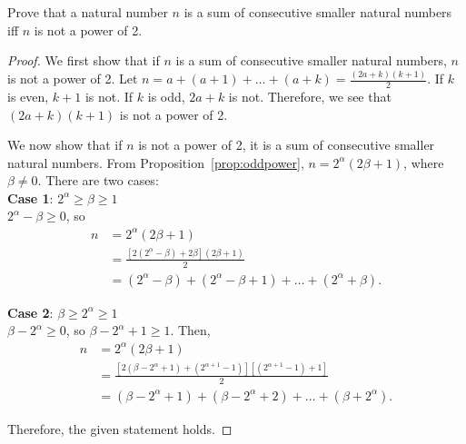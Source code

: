 \documentclass[../main.tex]{subfiles}
\begin{document}
\begin{prob} 
    Prove that a natural number $n$ is a sum of consecutive smaller natural numbers iff $n$ is not a power of 2.
\end{prob}
\begin{proof}
    We first show that if $n$ is a sum of consecutive smaller natural numbers, $n$ is not a power of 2.
    Let $n = a + (a+1) + \dots + (a+k) = \frac{(2a + k)(k+1)}{2}$.
    If $k$ is even, $k+1$ is not.
    If $k$ is odd, $2a + k$ is not.
    Therefore, we see that $(2a + k)(k + 1)$ is not a power of 2.

    We now show that if $n$ is not a power of 2, it is a sum of consecutive smaller natural numbers.
    From Proposition~\ref{prop:oddpower}, $n = 2^\alpha (2 \beta + 1)$, where $\beta \neq 0$.
    There are two cases:\\
    \noindent \textbf{Case 1}: $2^\alpha \geq \beta \geq 1$\\
    \indent $2^\alpha - \beta \geq 0$, so
    \begin{align*}
        n &= 2^\alpha (2\beta + 1)\\
          &= \frac{\left[2 \left(2^\alpha - \beta\right) + 2 \beta\right](2\beta + 1)}{2}\\
          &= \left(2^\alpha - \beta\right) + \left(2^\alpha - \beta + 1\right) + \dots + \left(2^\alpha + \beta\right).
    \end{align*}

    \noindent \textbf{Case 2}: $\beta \geq 2^\alpha \geq 1$\\
    \indent $\beta - 2^\alpha \geq 0$, so $\beta - 2^\alpha + 1 \geq 1$.
    Then,
    \begin{align*}
        n &= 2^\alpha (2\beta + 1)\\
          &= \frac{\left[2\left(\beta - 2^\alpha + 1\right) + \left(2^{\alpha+1} - 1\right)\right]\left[\left(2^{\alpha + 1} - 1\right) + 1\right]}{2}\\
          &= \left(\beta - 2^\alpha + 1\right) + \left(\beta - 2^\alpha + 2\right) + \dots + \left(\beta + 2^\alpha\right).
    \end{align*}

    Therefore, the given statement holds.
\end{proof}
\end{document}
